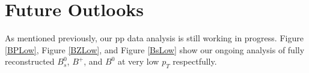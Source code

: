 









\section{Future Outlooks}

As mentioned previously, our pp data analysis is still working in progress. Figure \ref{BPLow}, Figure \ref{BZLow}, and Figure \ref{BsLow} show our ongoing analysis of fully reconstructed $B^0_s$, $B^+$, and $B^0$ at very low $p_T$ respectfully.


